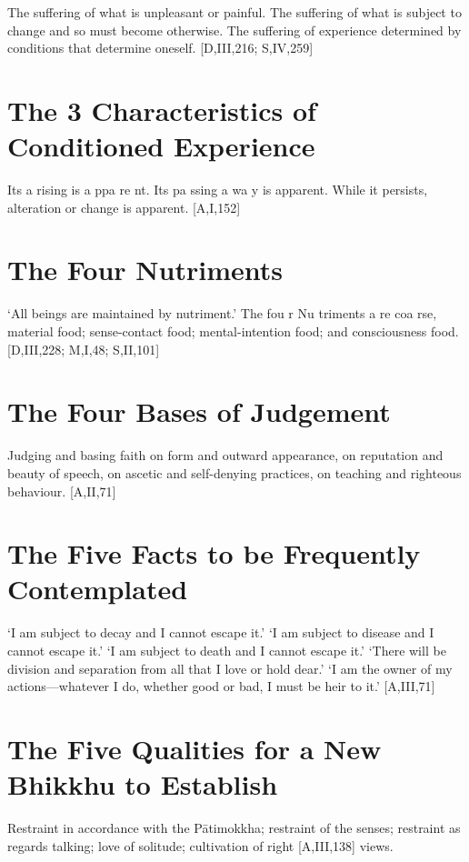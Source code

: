 The suffering of what is unpleasant or painful.
The suffering of what is subject to change and
so must become otherwise.
The suffering of experience determined by
conditions that determine oneself.
[D,III,216; S,IV,259]

\section{The 3 Characteristics of Conditioned Experience}

Its a rising is a ppa re nt. Its pa ssing a wa y is
apparent. While it persists, alteration or
change is apparent.
[A,I,152]

\section{The Four Nutriments}

‘All beings are maintained by nutriment.’ The
fou r Nu triments a re coa rse, material food;
sense-contact food; mental-intention food;
and consciousness food. [D,III,228; M,I,48; S,II,101]

\section{The Four Bases of Judgement}

Judging and basing faith on form and outward
appearance, on reputation and beauty of
speech, on ascetic and self-denying practices,
on teaching and righteous behaviour. [A,II,71]

\section{The Five Facts to be Frequently Contemplated}

‘I am subject to decay and I cannot escape it.’
‘I am subject to disease and I cannot escape it.’
‘I am subject to death and I cannot escape it.’
‘There will be division and separation from
all that I love or hold dear.’
‘I am the owner of my actions—whatever I do,
whether good or bad, I must be heir to it.’
[A,III,71]

\section{The Five Qualities for a New Bhikkhu to Establish}

Restraint in accordance with the Pātimokkha;
restraint of the senses; restraint as regards
talking; love of solitude; cultivation of right
[A,III,138]
views.

